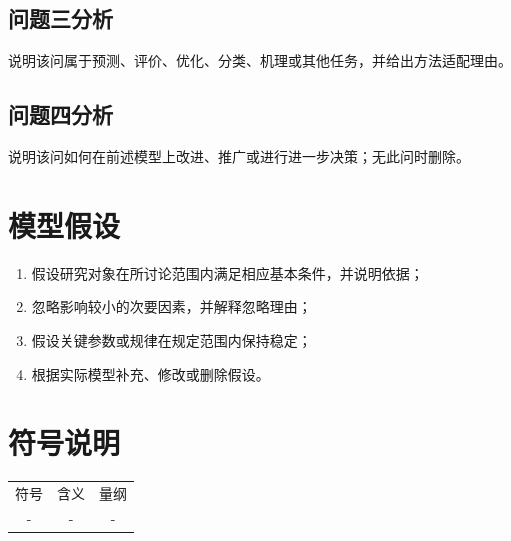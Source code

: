 \documentclass[UTF8,a4paper,12pt]{ctexart}
\newif\ifshowguide
\newcommand{\WriteGuide}[3]{%
  \ifshowguide
  \begin{quote}
    \small
    \textbf{写什么：}#1\par
    \textbf{怎么写：}#2\par
    \textbf{避免：}#3
  \end{quote}
  \fi
}
\begin{document}
\subsection{问题三分析}
说明该问属于预测、评价、优化、分类、机理或其他任务，并给出方法适配理由。

\subsection{问题四分析}
说明该问如何在前述模型上改进、推广或进行进一步决策；无此问时删除。

\section{模型假设}

\WriteGuide
  {只保留会影响模型边界、方程形式、数据处理或求解结果的假设。}
  {每条假设说明依据，并在模型评价中讨论假设不成立时可能产生的影响。}
  {使用与后文无关的套话；为了方便求解而忽略关键机制却不说明影响。}

\begin{enumerate}[label=\arabic*、,leftmargin=3em]
  \item 假设研究对象在所讨论范围内满足相应基本条件，并说明依据；
  \item 忽略影响较小的次要因素，并解释忽略理由；
  \item 假设关键参数或规律在规定范围内保持稳定；
  \item 根据实际模型补充、修改或删除假设。
\end{enumerate}

\section{符号说明}

\WriteGuide
  {列出全文高频、核心且容易混淆的符号。}
  {同一符号只表示一个含义；量纲写在第三列；局部只使用一次的符号可直接在公式后说明。}
  {符号表与正文不一致；遗漏量纲；同一字母重复表示多个概念。}

\begin{table}[htbp]
  \centering
  \begin{tabular}{ccc}
    \toprule
    符号 & 含义 & 量纲 \\
    -&-&- \\
    \bottomrule
  \end{tabular}
\end{table}
\end{document}
